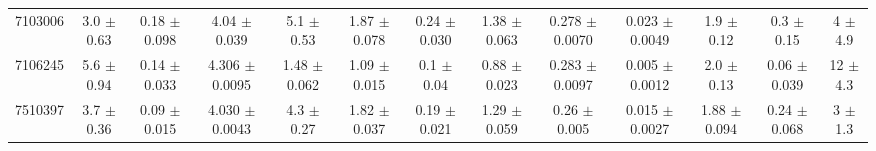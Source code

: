 \begin{table}[H]
\begin{tabular}{c|cccccc|cccccc}
7103006  &        3.0    $\pm$  0.63   &      0.18   $\pm$  0.098  &      4.04   $\pm$  0.039  &      5.1    $\pm$  0.53   &      1.87   $\pm$  0.078  &      0.24   $\pm$  0.030    &        1.38   $\pm$  0.063    &        0.278  $\pm$  0.0070   &        0.023  $\pm$  0.0049   &        1.9    $\pm$  0.12     &        0.3    $\pm$  0.15     &        4      $\pm$  4.9      \\
7106245  &        5.6    $\pm$  0.94   &      0.14   $\pm$  0.033  &      4.306  $\pm$  0.0095 &      1.48   $\pm$  0.062  &      1.09   $\pm$  0.015  &      0.1    $\pm$  0.04     &        0.88   $\pm$  0.023    &        0.283  $\pm$  0.0097   &        0.005  $\pm$  0.0012   &        2.0    $\pm$  0.13     &        0.06   $\pm$  0.039    &       12      $\pm$  4.3      \\
7510397  &        3.7    $\pm$  0.36   &      0.09   $\pm$  0.015  &      4.030  $\pm$  0.0043 &      4.3    $\pm$  0.27   &      1.82   $\pm$  0.037  &      0.19   $\pm$  0.021    &        1.29   $\pm$  0.059    &        0.26   $\pm$  0.005    &        0.015  $\pm$  0.0027   &        1.88   $\pm$  0.094    &        0.24   $\pm$  0.068    &        3      $\pm$  1.3      \\

\end{tabular}
\end{table}
